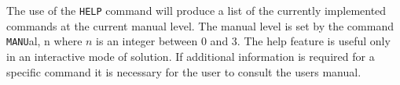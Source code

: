 \headb

The use of the {\tt HELP} command will produce a list of the
currently implemented commands at the current manual level.
The manual level is set by the command {\tt MANU}\-al, n where $n$ is
an integer between 0 and 3. The help feature is useful
only in an interactive mode of solution.  If
additional information is required for a specific command it
is necessary for the user to consult the users manual.
\vfill\eject
